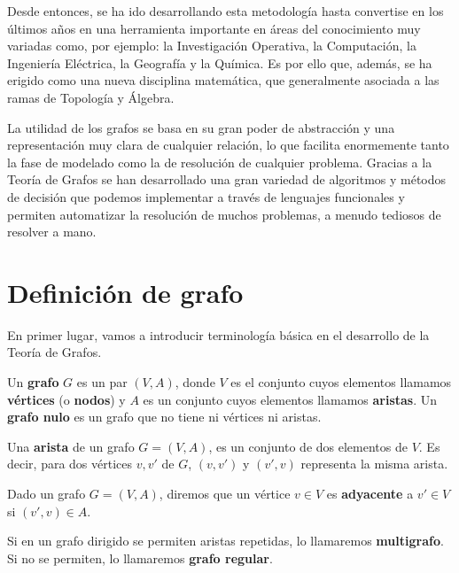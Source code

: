 Desde entonces, se ha ido desarrollando esta metodología hasta convertise en
los últimos años en una herramienta importante en áreas del conocimiento muy
variadas como, por ejemplo: la Investigación Operativa, la Computación, la
Ingeniería Eléctrica, la Geografía y la Química. Es por ello que, además, se ha
erigido como una nueva disciplina matemática, que generalmente asociada a las
ramas de Topología y Álgebra.

La utilidad de los grafos se basa en su gran poder de abstracción y una
representación muy clara de cualquier relación, lo que facilita enormemente
tanto la fase de modelado como la de resolución de cualquier problema. Gracias
a la Teoría de Grafos se han desarrollado una gran variedad de algoritmos y
métodos de decisión que podemos implementar a través de lenguajes funcionales y
permiten automatizar la resolución de muchos problemas, a menudo tediosos de
resolver a mano.


\minitoc

\section{Definición de grafo}

En primer lugar, vamos a introducir terminología básica en el 
desarrollo de la Teoría de Grafos.

\begin{definicion}
  Un \textbf{grafo} $G$ es un par $(V,A)$, donde $V$ es el conjunto 
  cuyos elementos llamamos \textbf{vértices} (o \textbf{nodos}) y 
  $A$ es un conjunto cuyos elementos llamamos \textbf{aristas}. Un 
  \textbf{grafo nulo} es un grafo que no tiene ni vértices ni aristas.
\end{definicion}

\begin{definicion}
  Una \textbf{arista} de un grafo $G = (V,A)$, es un conjunto de dos elementos
  de $V$. Es decir, para dos vértices $v,v'$ de $G$, $(v,v')$ y $(v',v)$
  representa la misma arista.
\end{definicion}

\begin{definicion}
  Dado un grafo $G = (V,A)$, diremos que un vértice $v \in V$ es 
  \textbf{adyacente} a $v' \in V$ si $(v',v) \in A$. 
\end{definicion}

\begin{definicion}
  Si en un grafo dirigido se permiten aristas repetidas, lo llamaremos 
  \textbf{multigrafo}. Si no se permiten, lo llamaremos 
  \textbf{grafo regular}.
\end{definicion}

